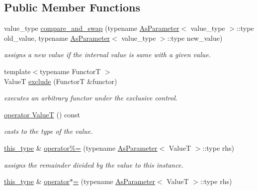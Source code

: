 \subsection*{Public Member Functions}
\begin{DoxyCompactItemize}
\item 
value\-\_\-type \hyperlink{group__atomic__operation_ga39b7ebbb7b13b8b1a0b05a4e04f4176f}{compare\-\_\-and\-\_\-swap} (typename \hyperlink{classhryky_1_1_as_parameter}{As\-Parameter}$<$ value\-\_\-type $>$\-::type old\-\_\-value, typename \hyperlink{classhryky_1_1_as_parameter}{As\-Parameter}$<$ value\-\_\-type $>$\-::type new\-\_\-value)
\begin{DoxyCompactList}\small\item\em assigns a new value if the internal value is same with a given value. \end{DoxyCompactList}\item 
{\footnotesize template$<$typename Functor\-T $>$ }\\Value\-T \hyperlink{group__atomic__operation_gae595f32af60a397c190c0d02fd5da565}{exclude} (Functor\-T \&functor)
\begin{DoxyCompactList}\small\item\em executes an arbitrary functor under the exclusive control. \end{DoxyCompactList}\item 
\hypertarget{group__atomic__operation_ga0d1ed1c369001d0f8bb4cdcacc0ea38b}{\hyperlink{group__atomic__operation_ga0d1ed1c369001d0f8bb4cdcacc0ea38b}{operator Value\-T} () const }\label{group__atomic__operation_ga0d1ed1c369001d0f8bb4cdcacc0ea38b}

\begin{DoxyCompactList}\small\item\em casts to the type of the value. \end{DoxyCompactList}\item 
\hypertarget{group__atomic__operation_ga4dcb98887412fd19c46efb2478f87277}{\hyperlink{classhryky_1_1atomic_1_1_writer_a6b1cad65fb3ef1a993a5eb9e91450aea}{this\-\_\-type} \& \hyperlink{group__atomic__operation_ga4dcb98887412fd19c46efb2478f87277}{operator\%=} (typename \hyperlink{classhryky_1_1_as_parameter}{As\-Parameter}$<$ Value\-T $>$\-::type rhs)}\label{group__atomic__operation_ga4dcb98887412fd19c46efb2478f87277}

\begin{DoxyCompactList}\small\item\em assigns the remainder divided by the value to this instance. \end{DoxyCompactList}\item 
\hypertarget{group__atomic__operation_ga40b0c967eb60601676828001bef4637c}{\hyperlink{classhryky_1_1atomic_1_1_writer_a6b1cad65fb3ef1a993a5eb9e91450aea}{this\-\_\-type} \& \hyperlink{group__atomic__operation_ga40b0c967eb60601676828001bef4637c}{operator$\ast$=} (typename \hyperlink{classhryky_1_1_as_parameter}{As\-Parameter}$<$ Value\-T $>$\-::type rhs)}\label{group__atomic__operation_ga40b0c967eb60601676828001bef4637c}


\end{DoxyCompactItemize}
